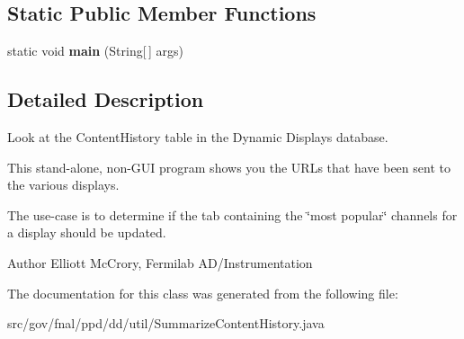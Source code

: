 \subsection*{Static Public Member Functions}
\begin{DoxyCompactItemize}
\item 
\hypertarget{classgov_1_1fnal_1_1ppd_1_1dd_1_1util_1_1SummarizeContentHistory_a03a17880420f2f09c7a7d4e77956d827}{static void {\bfseries main} (String\mbox{[}$\,$\mbox{]} args)}\label{classgov_1_1fnal_1_1ppd_1_1dd_1_1util_1_1SummarizeContentHistory_a03a17880420f2f09c7a7d4e77956d827}

\end{DoxyCompactItemize}


\subsection{Detailed Description}
Look at the Content\-History table in the Dynamic Displays database.

This stand-\/alone, non-\/\-G\-U\-I program shows you the U\-R\-Ls that have been sent to the various displays.

The use-\/case is to determine if the tab containing the \char`\"{}most popular\char`\"{} channels for a display should be updated.

\begin{DoxyAuthor}{Author}
Elliott Mc\-Crory, Fermilab A\-D/\-Instrumentation 
\end{DoxyAuthor}


The documentation for this class was generated from the following file\-:\begin{DoxyCompactItemize}
\item 
src/gov/fnal/ppd/dd/util/Summarize\-Content\-History.\-java\end{DoxyCompactItemize}

